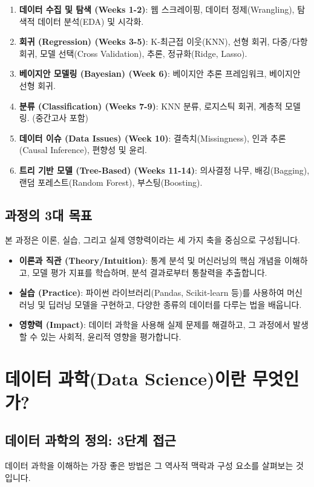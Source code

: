\documentclass[11pt,a4paper]{book}
\theoremstyle{definition}
\begin{document}
\begin{enumerate}
    \item \textbf{데이터 수집 및 탐색 (Weeks 1-2)}: 웹 스크레이핑, 데이터 정제(Wrangling), 탐색적 데이터 분석(EDA) 및 시각화.
    \item \textbf{회귀 (Regression) (Weeks 3-5)}: K-최근접 이웃(KNN), 선형 회귀, 다중/다항 회귀, 모델 선택(Cross Validation), 추론, 정규화(Ridge, Lasso).
    \item \textbf{베이지안 모델링 (Bayesian) (Week 6)}: 베이지안 추론 프레임워크, 베이지안 선형 회귀.
    \item \textbf{분류 (Classification) (Weeks 7-9)}: KNN 분류, 로지스틱 회귀, 계층적 모델링. (중간고사 포함)
    \item \textbf{데이터 이슈 (Data Issues) (Week 10)}: 결측치(Missingness), 인과 추론(Causal Inference), 편향성 및 윤리.
    \item \textbf{트리 기반 모델 (Tree-Based) (Weeks 11-14)}: 의사결정 나무, 배깅(Bagging), 랜덤 포레스트(Random Forest), 부스팅(Boosting).
\end{enumerate}

\subsection{과정의 3대 목표}
본 과정은 이론, 실습, 그리고 실제 영향력이라는 세 가지 축을 중심으로 구성됩니다.

\begin{itemize}
    \item \textbf{이론과 직관 (Theory/Intuition)}: 통계 분석 및 머신러닝의 핵심 개념을 이해하고, 모델 평가 지표를 학습하며, 분석 결과로부터 통찰력을 추출합니다.
    \item \textbf{실습 (Practice)}: 파이썬 라이브러리(Pandas, Scikit-learn 등)를 사용하여 머신러닝 및 딥러닝 모델을 구현하고, 다양한 종류의 데이터를 다루는 법을 배웁니다.
    \item \textbf{영향력 (Impact)}: 데이터 과학을 사용해 실제 문제를 해결하고, 그 과정에서 발생할 수 있는 사회적, 윤리적 영향을 평가합니다.
\end{itemize}


\section{데이터 과학(Data Science)이란 무엇인가?}

\subsection{데이터 과학의 정의: 3단계 접근}
데이터 과학을 이해하는 가장 좋은 방법은 그 역사적 맥락과 구성 요소를 살펴보는 것입니다.
\end{document}
